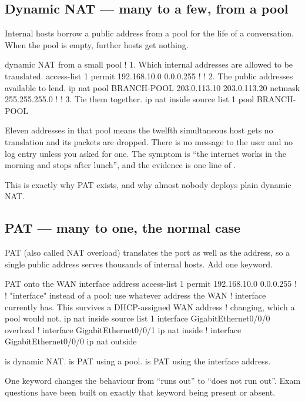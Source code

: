 \subsection{Dynamic NAT --- many to a few, from a pool}

Internal hosts borrow a public address from a pool for the life of a
conversation. When the pool is empty, further hosts get nothing.

\begin{config}{dynamic NAT from a small pool}
! 1. Which internal addresses are allowed to be translated.
access-list 1 permit 192.168.10.0 0.0.0.255
!
! 2. The public addresses available to lend.
ip nat pool BRANCH-POOL 203.0.113.10 203.0.113.20 netmask 255.255.255.0
!
! 3. Tie them together.
ip nat inside source list 1 pool BRANCH-POOL
\end{config}

\begin{alertbox}
Eleven addresses in that pool means the twelfth simultaneous host gets no
translation and its packets are dropped. There is no message to the user and no
log entry unless you asked for one. The symptom is ``the internet works in the
morning and stops after lunch'', and the evidence is one line of
.

This is exactly why PAT exists, and why almost nobody deploys plain dynamic NAT.
\end{alertbox}

\subsection{PAT --- many to one, the normal case}

PAT (also called NAT overload) translates the port as well as the address, so a
single public address serves thousands of internal hosts. Add one keyword.

\begin{config}{PAT onto the WAN interface address}
access-list 1 permit 192.168.10.0 0.0.0.255
!
! "interface" instead of a pool: use whatever address the WAN
! interface currently has. This survives a DHCP-assigned WAN address
! changing, which a pool would not.
ip nat inside source list 1 interface GigabitEthernet0/0/0 overload
!
interface GigabitEthernet0/0/1
 ip nat inside
!
interface GigabitEthernet0/0/0
 ip nat outside
\end{config}

\begin{examnote}
 is dynamic NAT.
 is PAT using a pool.
 is PAT using the
interface address.

One keyword changes the behaviour from ``runs out'' to ``does not run out''.
Exam questions have been built on exactly that keyword being present or absent.
\end{examnote}

